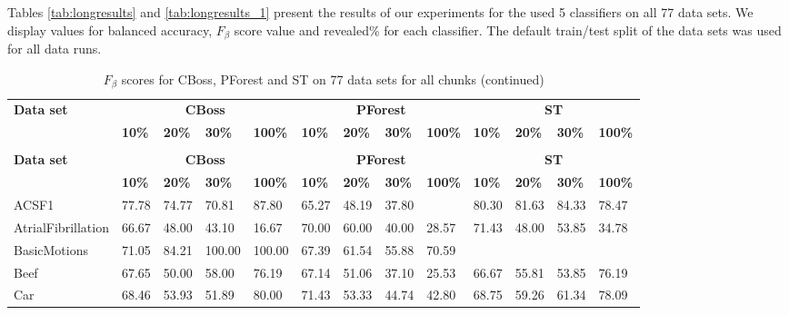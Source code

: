 Tables \ref{tab:longresults} and \ref{tab:longresults_1} present the results of our experiments for the used 5 classifiers on all 77 data sets.
We display values for balanced accuracy, $F_{\beta}$ score value and revealed\% for each classifier.
The default train/test split of the data sets was used for all data runs.

\begin{landscape}
    \begin{longtable}{|l|llll|llll|llll|}
      \caption{$F_{\beta}$ scores for CBoss, PForest and ST on 77 data sets for all chunks}\\
      \hline
      \multirow{2}{*}{\textbf{Data set}} & 
      \multicolumn{4}{c}{\textbf{CBoss}} & \multicolumn{4}{c}{\textbf{PForest}} & \multicolumn{4}{c}{\textbf{ST}} \\
      & \textbf{10\%} & \textbf{20\%} & \textbf{30\%} & \textbf{100\%} & \textbf{10\%} & \textbf{20\%} & \textbf{30\%} & \textbf{100\%} & \textbf{10\%} & \textbf{20\%} & \textbf{30\%} & \textbf{100\%} \\ [0.5ex]
      \hline
      \endfirsthead %
      \caption{$F_{\beta}$ scores for CBoss, PForest and ST on 77 data sets for all chunks (continued)}\\
      \hline
      \multirow{2}{*}{\textbf{Data set}} & 
      \multicolumn{4}{c}{\textbf{CBoss}} & \multicolumn{4}{c}{\textbf{PForest}} & \multicolumn{4}{c}{\textbf{ST}} \\
      & \textbf{10\%} & \textbf{20\%} & \textbf{30\%} & \textbf{100\%} & \textbf{10\%} & \textbf{20\%} & \textbf{30\%} & \textbf{100\%} & \textbf{10\%} & \textbf{20\%} & \textbf{30\%} & \textbf{100\%} \\ [0.5ex]
      \hline
      \endhead %
      ACSF1 & 77.78 & 74.77 & 70.81 & 87.80 & 65.27 & 48.19 & 37.80 &   & 80.30 & 81.63 & 84.33 & 78.47 \\ \hline
      AtrialFibrillation & 66.67 & 48.00 & 43.10 & 16.67 & 70.00 & 60.00 & 40.00 & 28.57 & 71.43 & 48.00 & 53.85 & 34.78 \\ \hline
      BasicMotions & 71.05 & 84.21 & 100.00 & 100.00 & 67.39 & 61.54 & 55.88 & 70.59 &   &   &   &   \\ \hline
      Beef & 67.65 & 50.00 & 58.00 & 76.19 & 67.14 & 51.06 & 37.10 & 25.53 & 66.67 & 55.81 & 53.85 & 76.19 \\ \hline
      Car & 68.46 & 53.93 & 51.89 & 80.00 & 71.43 & 53.33 & 44.74 & 42.80 & 68.75 & 59.26 & 61.34 & 78.09 \\ \hline

\end{longtable}
\end{landscape}
